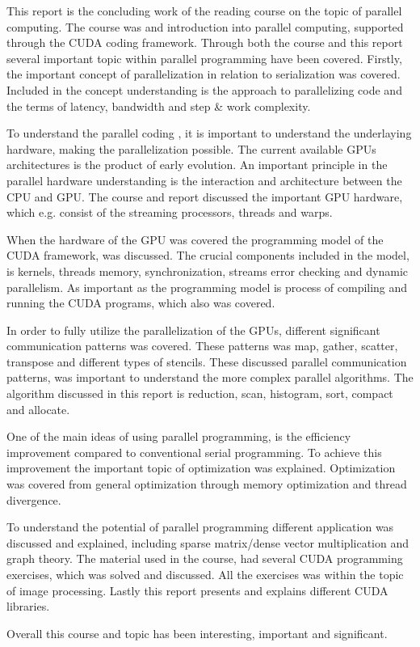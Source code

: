 This report is the concluding work of the reading course on the topic of parallel computing. The course was and introduction into parallel computing, supported through the CUDA coding framework. Through both the course and this report several important topic within parallel programming have been covered. Firstly, the important concept of parallelization in relation to serialization was covered. Included in the concept understanding is the approach to parallelizing code and the terms of latency, bandwidth and step \& work complexity.

To understand the parallel coding , it is important to understand the underlaying hardware, making the parallelization possible. The current available GPUs architectures is the product of early evolution. An important principle in the parallel hardware understanding is the interaction and architecture between the CPU and GPU. The course and report discussed the important GPU hardware, which e.g. consist of the streaming processors, threads and warps. 

When the hardware of the GPU was covered the programming model of the CUDA framework, was discussed. The crucial components included in the model, is kernels, threads memory, synchronization, streams error checking and dynamic parallelism. As important as the programming model is process of compiling and running the CUDA programs, which also was covered.

In order to fully utilize the parallelization of the GPUs, different significant communication patterns was covered. These patterns was map, gather, scatter, transpose and different types of stencils. These discussed parallel communication patterns, was important to understand the more complex parallel algorithms. The algorithm discussed in this report is reduction, scan, histogram, sort, compact and allocate. 

One of the main ideas of using parallel programming, is the efficiency improvement compared to conventional serial programming. To achieve this improvement the important topic of optimization was explained. Optimization was covered from general optimization through memory optimization and thread divergence. 

To understand the potential of parallel programming different application was discussed and explained, including sparse matrix/dense vector multiplication and graph theory. The material used in the course, had several CUDA programming exercises, which was solved and discussed. All the exercises was within the topic of image processing. Lastly this report presents and explains different CUDA libraries. 

Overall this course and topic has been interesting, important and significant.    